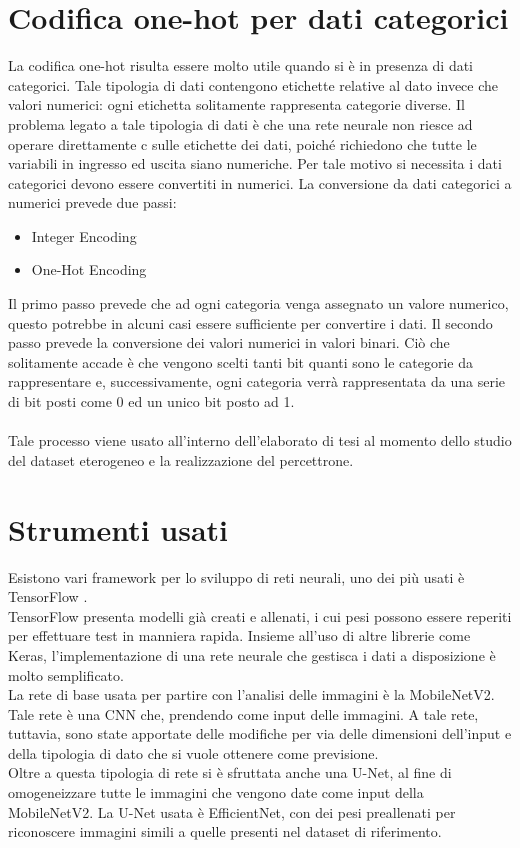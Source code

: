 \section{Codifica one-hot per dati categorici}
La codifica one-hot risulta essere molto utile quando si è in presenza di dati categorici. Tale tipologia di dati
contengono etichette relative al dato invece che valori numerici: ogni etichetta solitamente rappresenta 
categorie diverse.
Il problema legato a tale tipologia di dati è che una rete neurale non riesce ad operare direttamente c
sulle etichette dei dati, poiché richiedono che tutte le variabili in ingresso ed uscita siano numeriche.
Per tale motivo si necessita i dati categorici devono essere convertiti in numerici.
La conversione da dati categorici a numerici prevede due passi:
\begin{itemize}
    \item Integer Encoding
    \item One-Hot Encoding
\end{itemize}
Il primo passo prevede che ad ogni categoria venga assegnato un valore numerico, questo potrebbe in 
alcuni casi essere sufficiente per convertire i dati.
Il secondo passo prevede la conversione dei valori numerici in valori binari.
Ciò che solitamente accade è che vengono scelti tanti bit quanti sono le categorie da rappresentare 
e, successivamente, ogni categoria verrà rappresentata da una serie di bit posti come 0 ed un unico bit 
posto ad 1.
\\\\
Tale processo viene usato all'interno dell'elaborato di tesi al momento dello studio del dataset eterogeneo 
e la realizzazione del percettrone.
\section{Strumenti usati}
Esistono vari framework per lo sviluppo di reti neurali, uno dei più usati è TensorFlow \cite{tsf}. 
\\
TensorFlow presenta modelli già creati e allenati, i cui pesi possono essere reperiti per effettuare test in manniera rapida.
Insieme all'uso di altre librerie come Keras, l'implementazione di una rete neurale che gestisca i dati a disposizione 
è molto semplificato.
\\
La rete di base usata per partire con l'analisi delle immagini è la MobileNetV2. Tale rete è una CNN che, prendendo come input delle 
immagini.
A tale rete, tuttavia, sono state apportate delle modifiche per via delle dimensioni dell'input e della tipologia di dato 
che si vuole ottenere come previsione.
\\
Oltre a questa tipologia di rete si è sfruttata anche una U-Net, al fine di omogeneizzare tutte le immagini che vengono date come input della MobileNetV2.
La U-Net usata è EfficientNet, con dei pesi preallenati per riconoscere immagini simili a quelle presenti nel dataset di riferimento.

